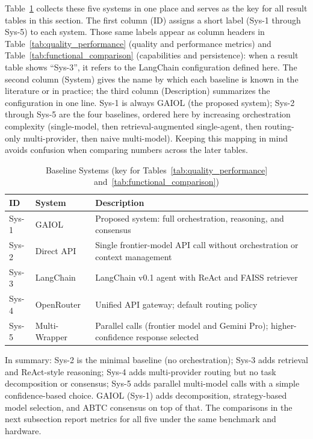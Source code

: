 \documentclass{iopjournal}
\begin{document}
Table~\ref{tab:baselines} collects these five systems in one place and serves as the key for all result tables in this section. The first column (ID) assigns a short label (Sys-1 through Sys-5) to each system. Those same labels appear as column headers in Table~\ref{tab:quality_performance} (quality and performance metrics) and Table~\ref{tab:functional_comparison} (capabilities and persistence): when a result table shows ``Sys-3'', it refers to the LangChain configuration defined here. The second column (System) gives the name by which each baseline is known in the literature or in practice; the third column (Description) summarizes the configuration in one line. Sys-1 is always GAIOL (the proposed system); Sys-2 through Sys-5 are the four baselines, ordered here by increasing orchestration complexity (single-model, then retrieval-augmented single-agent, then routing-only multi-provider, then naive multi-model). Keeping this mapping in mind avoids confusion when comparing numbers across the later tables.
\begin{table}[H]
\centering
\caption{Baseline Systems (key for Tables~\ref{tab:quality_performance} and~\ref{tab:functional_comparison})}
\label{tab:baselines}
\begin{tabularx}{\linewidth}{@{}l l >{\raggedright\arraybackslash}X@{}}
\toprule
ID & System & Description \\
\midrule
Sys-1 & GAIOL & Proposed system: full orchestration, reasoning, and consensus \\
Sys-2 & Direct API & Single frontier-model API call without orchestration or context management \\
Sys-3 & LangChain & LangChain v0.1 agent with ReAct and FAISS retriever \\
Sys-4 & OpenRouter & Unified API gateway; default routing policy \\
Sys-5 & Multi-Wrapper & Parallel calls (frontier model and Gemini Pro); higher-confidence response selected \\
\bottomrule
\end{tabularx}
\end{table}

In summary: Sys-2 is the minimal baseline (no orchestration); Sys-3 adds retrieval and ReAct-style reasoning; Sys-4 adds multi-provider routing but no task decomposition or consensus; Sys-5 adds parallel multi-model calls with a simple confidence-based choice. GAIOL (Sys-1) adds decomposition, strategy-based model selection, and ABTC consensus on top of that. The comparisons in the next subsection report metrics for all five under the same benchmark and hardware.
\end{document}
